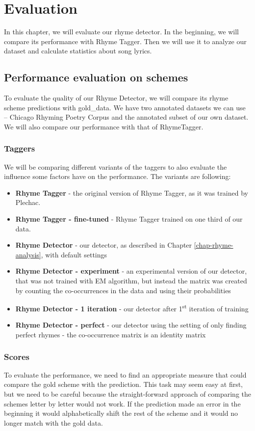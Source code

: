 \chapter{Evaluation}\label{evaluation}
In this chapter, we will evaluate our rhyme detector. In the beginning, we will compare its performance with Rhyme Tagger. Then we will use it to analyze our dataset and calculate statistics about song lyrics.

\section{Performance evaluation on schemes}
To evaluate the quality of our Rhyme Detector, we will compare its rhyme scheme predictions with \gls{gold_data}. We have two annotated datasets we can use -- Chicago Rhyming Poetry Corpus and  the annotated subset of our own dataset. We will also compare our performance with that of RhymeTagger.

\subsection{Taggers}
We will be comparing different variants of the taggers to also evaluate the influence some factors have on the performance. The variants are following:
\begin{itemize}
	\item \textbf{Rhyme Tagger} - the original version of Rhyme Tagger, as it was trained by Plechac.
	\item \textbf{Rhyme Tagger - fine-tuned} - Rhyme Tagger trained on one third of our data.
	\item \textbf{Rhyme Detector} - our detector, as described in Chapter \ref{chap-rhyme-analysis}, with default settings
	\item \textbf{Rhyme Detector - experiment} - an experimental version of our detector, that was not trained with EM algorithm, but instead the matrix was created by counting the co-occurrences in the data and using their probabilities
	\item \textbf{Rhyme Detector - 1 iteration} - our detector after 1\textsuperscript{st} iteration of training
	\item \textbf{Rhyme Detector - perfect} - our detector using the setting of only finding perfect rhymes - the co-occurrence matrix is an identity matrix
\end{itemize}

\subsection{Scores}
To evaluate the performance, we need to find an appropriate measure that could compare the gold scheme with the prediction. This task may seem easy at first, but we need to be careful because the straight-forward approach of comparing the schemes letter by letter would not work. If the prediction made an error in the beginning it would alphabetically shift the rest of the scheme and it would no longer match with the gold data.

